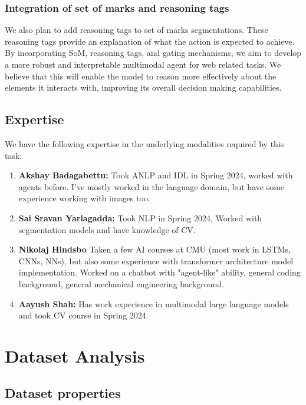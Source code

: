 \documentclass[11pt,a4paper]{article}
\begin{document}
\subsubsection{Integration of set of marks and reasoning tags}
We also plan to add reasoning tags to set of marks \cite{yang2023set} segmentations. These reasoning tags provide an explanation of what the action is expected to achieve. 
By incorporating SoM, reasoning tags, and gating mechanisms, we aim to develop a more robust and interpretable multimodal agent for web related tasks. We believe that this will enable the model to reason more effectively about the elements it interacts with, improving its overall decision making capabilities.

\subsection{Expertise}
We have the following expertise in the underlying modalities required by this task:
  \begin{enumerate}
      \item \textbf{Akshay Badagabettu:} Took ANLP and IDL in Spring 2024, worked with agents before. I've mostly worked in the language domain, but have some experience working with images too.
      \item \textbf{Sai Sravan Yarlagadda:} Took NLP in Spring 2024, Worked with segmentation models and have knowledge of CV.
      \item \textbf{Nikolaj Hindsbo} Taken a few AI courses at CMU (most work in LSTMs, CNNs, NNs), but also some experience with transformer architecture model implementation. Worked on a chatbot with "agent-like" ability, general coding background, general mechanical engineering background. 
      \item \textbf{Aayush Shah:} Has work experience in multimodal large language models and took CV course in Spring 2024. 
  \end{enumerate}

\section{Dataset Analysis}
\subsection{Dataset properties} %
\end{document}
